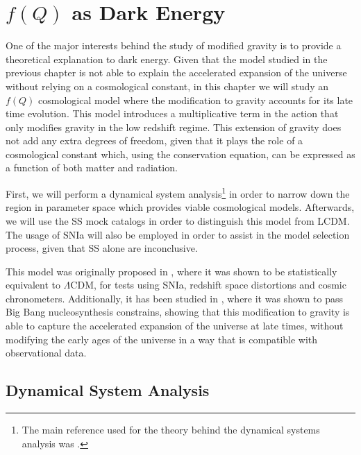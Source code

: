 \chapter{$f(Q)$ as Dark Energy}
\label{chap:STG-dark-energy}

One of the major interests behind the study of modified gravity is to provide a theoretical explanation to dark energy.
Given that the model studied in the previous chapter is not able to explain the accelerated expansion of the universe without relying on a cosmological constant, in this chapter we will study an $f(Q)$ cosmological model where the modification to gravity accounts for its late time evolution. This model introduces a multiplicative term in the action that only modifies gravity in the low redshift regime. This extension of gravity does not add any extra degrees of freedom, given that it plays the role of a cosmological constant which, using the conservation equation, can be expressed as a function of both matter and radiation.

First, we will perform a dynamical system analysis\footnote{The main reference used for the theory behind the dynamical systems analysis was \cite{Strogatz}.} in order to narrow down the region in parameter space which provides viable cosmological models. Afterwards, we will use the \gls{SS} mock catalogs in order to distinguish this model from \gls{LCDM}. The usage of \gls{SNIa} will also be employed in order to assist in the model selection process, given that \gls{SS} alone are inconclusive.

This model was originally proposed in \cite{Anagnostopoulos2021}, where it was shown to be statistically equivalent to $\Lambda$CDM, for tests using \gls{SNIa}, redshift space distortions and cosmic chronometers. Additionally, it has been studied in \cite{Anagnostopoulos2022}, where it was shown to pass Big Bang nucleosynthesis constrains, showing that this modification to gravity is able to capture the accelerated expansion of the universe at late times, without modifying the early ages of the universe in a way that is compatible with observational data.


\section{Dynamical System Analysis}
\label{sec:dynamical-system-analysis}

